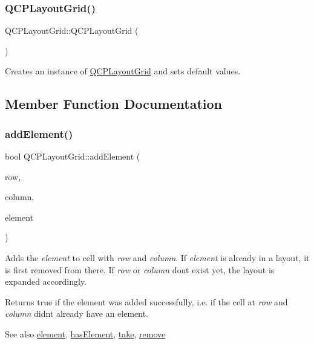 \subsubsection{\texorpdfstring{Q\+C\+P\+Layout\+Grid()}{QCPLayoutGrid()}}
{\footnotesize\ttfamily Q\+C\+P\+Layout\+Grid\+::\+Q\+C\+P\+Layout\+Grid (\begin{DoxyParamCaption}{ }\end{DoxyParamCaption})\hspace{0.3cm}{\ttfamily [explicit]}}

Creates an instance of \mbox{\hyperlink{class_q_c_p_layout_grid}{Q\+C\+P\+Layout\+Grid}} and sets default values. 

\subsection{Member Function Documentation}
\mbox{\label{class_q_c_p_layout_grid_adff1a2ca691ed83d2d24a4cd1fe17012}} 
\subsubsection{\texorpdfstring{add\+Element()}{addElement()}}
{\footnotesize\ttfamily bool Q\+C\+P\+Layout\+Grid\+::add\+Element (\begin{DoxyParamCaption}\item[{int}]{row,  }\item[{int}]{column,  }\item[{\mbox{\hyperlink{class_q_c_p_layout_element}{Q\+C\+P\+Layout\+Element}} $\ast$}]{element }\end{DoxyParamCaption})}

Adds the {\itshape element} to cell with {\itshape row} and {\itshape column}. If {\itshape element} is already in a layout, it is first removed from there. If {\itshape row} or {\itshape column} don\textquotesingle{}t exist yet, the layout is expanded accordingly.

Returns true if the element was added successfully, i.\+e. if the cell at {\itshape row} and {\itshape column} didn\textquotesingle{}t already have an element.

\begin{DoxySeeAlso}{See also}
\mbox{\hyperlink{class_q_c_p_layout_grid_a602b426609b4411cf6a93c3ddf3a381a}{element}}, \mbox{\hyperlink{class_q_c_p_layout_grid_ab0cf4f7edc9414a3bfaddac0f46dc0a0}{has\+Element}}, \mbox{\hyperlink{class_q_c_p_layout_grid_a666a9fe9e92054436f9b66eba25cca0c}{take}}, \mbox{\hyperlink{class_q_c_p_layout_a6c58f537d8086f352576ab7c5b15d0bc}{remove}} 
\end{DoxySeeAlso}
\mbox{\label{class_q_c_p_layout_grid_a1a2962cbf45011405b64b913afa8e7a2}} 
